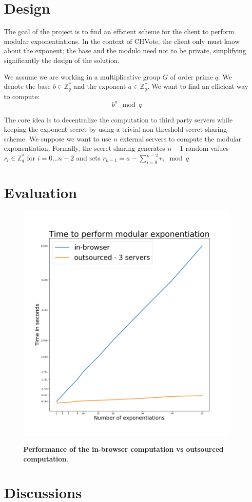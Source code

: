 \documentclass[]{article}
\newcommand{\ZZ}{\ensuremath{\mathbb{Z}}}
\begin{document}
\section{Design} \label{design}

The goal of the project is to find an efficient scheme for the client to perform
modular exponentiations. In the context of CHVote, the client only must know
about the exponent; the base and the modulo need not to be private, simplifying
significantly the design of the solution.

We assume we are working in a multiplicative group $G$ of order prime $q$. We denote
the base $b \in \ZZ_q^*$ and the exponent $a \in \ZZ_q^*$. We want to find an
efficient way to compute: $$ b^a \mod q $$

The core idea is to decentralize the computation to third party servers while
keeping the exponent secret by using a trivial non-threshold secret sharing
scheme. We suppose we want to use $n$ external servers to compute the modular
exponentiation. Formally, the secret sharing generates $n-1$ random values $r_i
\in \ZZ_q^*$ for $i=0...n-2$ and sets $r_{n-1} = {a - \sum_{i=0}^{n-2} r_i} \mod
q$

\section{Evaluation} \label{evaluation}

\begin{figure}[!htb]
    \begin{center}
        \label{fig:system}
        \includegraphics[trim={0 8cm 0
        1cm},clip,width=1.2\textwidth]{local_vs_split_50.png}
        \caption{\textbf{Performance of the in-browser computation vs
        outsourced computation}.}
    \end{center}
\end{figure}

\section{Discussions} \label{discussions}



\end{document}
